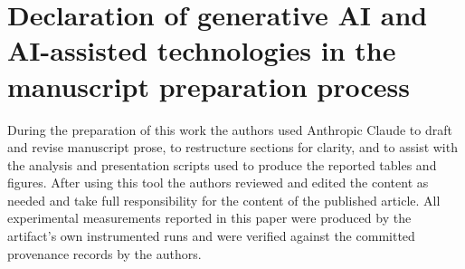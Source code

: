 \section*{Declaration of generative AI and AI-assisted technologies in the
manuscript preparation process}

During the preparation of this work the authors used Anthropic Claude to draft
and revise manuscript prose, to restructure sections for clarity, and to assist
with the analysis and presentation scripts used to produce the reported tables
and figures. After using this tool the authors reviewed and edited the content
as needed and take full responsibility for the content of the published
article. All experimental measurements reported in this paper were produced by the
artifact's own instrumented runs and were verified against the committed
provenance records by the authors.
